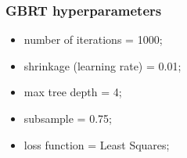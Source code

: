 \documentclass{beamer}
\begin{document}

\begin{frame}
    \frametitle{GBRT hyperparameters}
    \begin{itemize}
        \item \alert{number of iterations  = 1000; }
        \item \alert{shrinkage (learning rate) = 0.01; }
        \item max tree depth = 4; 
        \item subsample = 0.75; 
        \item loss function = Least Squares; 
    \end{itemize}
    \vspace{1cm}
     \qquad
\end{frame}
\end{document}
